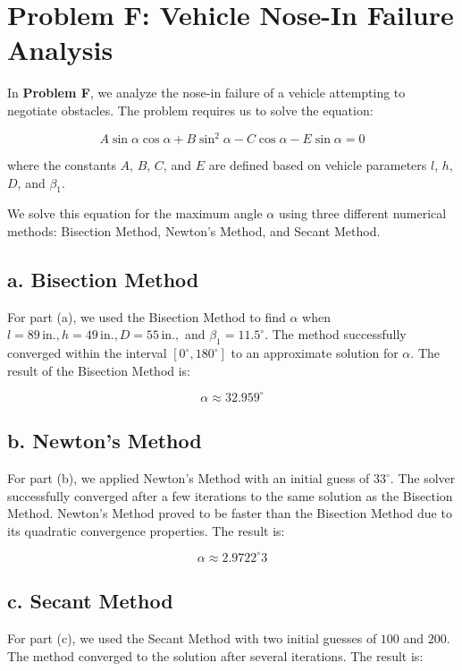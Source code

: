 \documentclass[a4paper]{article}
\begin{document}
\section{Problem F: Vehicle Nose-In Failure Analysis}

In \textbf{Problem F}, we analyze the nose-in failure of a vehicle attempting to negotiate obstacles. The problem requires us to solve the equation:

\[
A \sin \alpha \cos \alpha + B \sin^2 \alpha - C \cos \alpha - E \sin \alpha = 0
\]

where the constants \( A \), \( B \), \( C \), and \( E \) are defined based on vehicle parameters \( l \), \( h \), \( D \), and \( \beta_1 \).

We solve this equation for the maximum angle \( \alpha \) using three different numerical methods: Bisection Method, Newton's Method, and Secant Method.

\subsection* {a. Bisection Method}
For part (a), we used the Bisection Method to find \( \alpha \) when \( l = 89 \, \text{in.}, h = 49 \, \text{in.}, D = 55 \, \text{in.}, \) and \( \beta_1 = 11.5^\circ \). The method successfully converged within the interval \([0^\circ, 180^\circ]\) to an approximate solution for \( \alpha \). The result of the Bisection Method is:

\[
\alpha \approx 32.959^\circ
\]

\subsection* {b. Newton's Method}
For part (b), we applied Newton's Method with an initial guess of \( 33^\circ \). The solver successfully converged after a few iterations to the same solution as the Bisection Method. Newton's Method proved to be faster than the Bisection Method due to its quadratic convergence properties. The result is:

\[
\alpha \approx 2.9722^\circ3
\]

\subsection* {c. Secant Method}
For part (c), we used the Secant Method with two initial guesses of \( 100 \) and \( 200 \). The method converged to the solution after several iterations. The result is:
\end{document}
